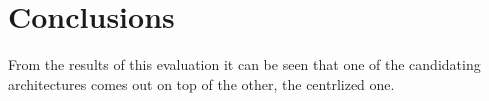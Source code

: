 \newpage
\section{Conclusions}
\label{S6}
From the results of this evaluation it can be seen that one of the candidating architectures comes out on top of the other, the centrlized one. 